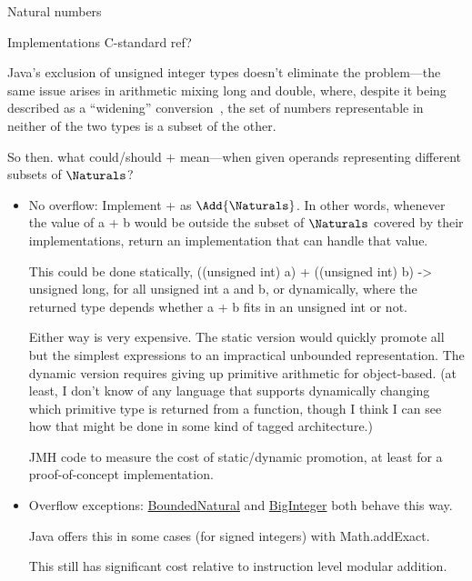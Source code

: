 \documentclass[12pt]{PalisadesLakesBook}
\begin{document}
\begin{plSection}{Natural numbers}
\begin{plSection}{Implementations}
\TODO C-standard ref?

\NOTE Java's exclusion of unsigned integer types doesn't
eliminate the problem---the same issue arises in arithmetic mixing
{\javaFont long} and {\javaFont double},
where, despite it being described as a ``widening'' conversion~\cite[section 5.1.2]{GoslingEtAl:2021:JLS16},
the set of numbers representable in neither of the two types
is a subset of the other.

So then. what could/should $+$ mean---when given operands
representing different subsets of $\Naturals$?
\begin{itemize}
  \item No overflow: Implement {\javaFont +} as 
  $\Add{\Naturals}$. In other words, whenever the value of 
  {\javaFont a + b} would be outside the subset of $\Naturals$
  covered by their implementations, return an implementation
  that can handle that value. 
  
  This could be done statically,
  {\javaFont 
  ((unsigned int) a) + ((unsigned int) b) -> unsigned long},
  for all {\javaFont unsigned int} {\javaFont a} and {\javaFont b},
  or dynamically, where the returned type depends whether 
  {\javaFont a + b} fits in an {\javaFont unsigned int} or not.
  
  Either way is very expensive. The static version would quickly
  promote all but the simplest expressions to an impractical
  unbounded representation.
  The dynamic version requires giving up primitive arithmetic
  for object-based. (at least, I don't know of any language 
  that supports dynamically changing which primitive type is
  returned from a function, though I think I can see how 
  that might be done in some kind of tagged architecture.)
  
  \TODO JMH code to measure the cost of static/dynamic promotion,
  at least for a proof-of-concept implementation.
  
  \item Overflow exceptions: 
  \href{https://github.com/palisades-lakes/nzqr/blob/main/src/main/java/nzqr/java/numbers/BoundedNatural.java}
{\javaFont BoundedNatural} and 
\href{https://github.com/openjdk/jdk/blob/master/src/java.base/share/classes/java/math/BigInteger.java}
{\javaFont BigInteger}
both behave this way.
  
  Java offers this in some cases (for signed integers)
  with {\javaFont Math.addExact}.
  
  This still has significant cost relative to instruction level
  modular addition.
  

\end{itemize}
\end{plSection}
\end{plSection}
\end{document}
